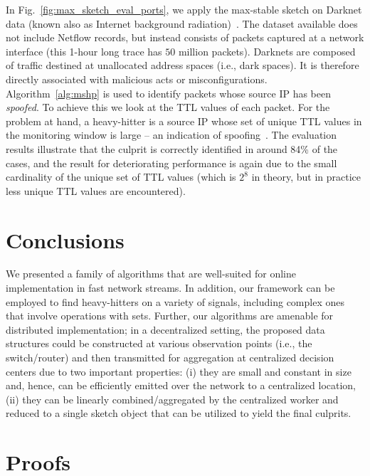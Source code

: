 \documentclass[10pt, conference, letterpaper,onecolumn]{IEEEtranv1.8}
\theoremstyle{plain}\newtheorem{thm}{Theorem}\newtheorem{lem}{Lemma}
\theoremstyle{definition}
\begin{document}
In Fig.~\ref{fig:max_sketch_eval_ports}, we apply the max-stable sketch on Darknet data (known also as Internet background radiation)~\cite{wustrow:2010:radiation}. 
The dataset available does not include Netflow records, but instead consists of  packets captured at a network interface
(this 1-hour long trace  has $50$ million packets). Darknets are composed of traffic destined at unallocated address spaces 
(i.e., dark spaces). It is therefore directly
associated with malicious acts or misconfigurations.  Algorithm~\ref{alg:mshp} is used to identify packets whose source IP has been \emph{spoofed}.
To achieve this we look at the TTL values of each packet. For the problem at hand,  a heavy-hitter is a source IP whose set of unique TTL
values in the monitoring window is large -- an indication of spoofing~\cite{Beverly:2005:SPI:1251282.1251290}. 
The evaluation results illustrate that the culprit is correctly identified in around 84\% of the cases, and the result for deteriorating performance is again due to the small cardinality of the unique set of TTL values (which is $2^8$ in theory, but
in practice less unique TTL values are encountered).


\section{Conclusions}

 We presented a family of algorithms that are well-suited
 for online implementation in fast network streams. In addition,
 our framework can be employed to find heavy-hitters on
 a variety of signals, including complex ones that involve operations with sets.
 Further, our algorithms are amenable for distributed implementation;
in a decentralized setting, the proposed
 data structures could be constructed at various
observation points (i.e., the switch/router)
and then transmitted for aggregation at centralized decision centers
due to two important properties: (i)  they are small and constant in size and, hence,
can be efficiently emitted over the network to a centralized location, (ii)
they can be linearly combined/aggregated  by the centralized worker and reduced to
a single sketch object that can be utilized to yield the final culprits. 



\appendix



\section{Proofs}
\end{document}
